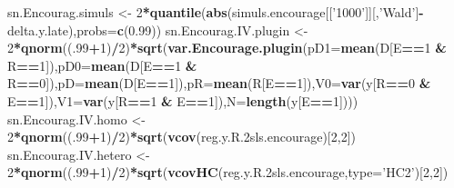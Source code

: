 \documentclass[]{book}
\newenvironment{Shaded}{\begin{snugshade}}{\end{snugshade}}
\newcommand{\DataTypeTok}[1]{\textcolor[rgb]{0.13,0.29,0.53}{#1}}
\newcommand{\DecValTok}[1]{\textcolor[rgb]{0.00,0.00,0.81}{#1}}
\newcommand{\FloatTok}[1]{\textcolor[rgb]{0.00,0.00,0.81}{#1}}
\newcommand{\KeywordTok}[1]{\textcolor[rgb]{0.13,0.29,0.53}{\textbf{#1}}}
\newcommand{\NormalTok}[1]{#1}
\newcommand{\OperatorTok}[1]{\textcolor[rgb]{0.81,0.36,0.00}{\textbf{#1}}}
\newcommand{\StringTok}[1]{\textcolor[rgb]{0.31,0.60,0.02}{#1}}
\theoremstyle{definition}
\theoremstyle{definition}
\theoremstyle{definition}
\theoremstyle{remark}
\begin{document}
\begin{Shaded}
\begin{Highlighting}[]
\NormalTok{sn.Encourag.simuls <-}\StringTok{ }\DecValTok{2}\OperatorTok{*}\KeywordTok{quantile}\NormalTok{(}\KeywordTok{abs}\NormalTok{(simuls.encourage[[}\StringTok{'1000'}\NormalTok{]][,}\StringTok{'Wald'}\NormalTok{]}\OperatorTok{-}\NormalTok{delta.y.late),}\DataTypeTok{probs=}\KeywordTok{c}\NormalTok{(}\FloatTok{0.99}\NormalTok{))}
\NormalTok{sn.Encourag.IV.plugin <-}\StringTok{ }\DecValTok{2}\OperatorTok{*}\KeywordTok{qnorm}\NormalTok{((.}\DecValTok{99}\OperatorTok{+}\DecValTok{1}\NormalTok{)}\OperatorTok{/}\DecValTok{2}\NormalTok{)}\OperatorTok{*}\KeywordTok{sqrt}\NormalTok{(}\KeywordTok{var.Encourage.plugin}\NormalTok{(}\DataTypeTok{pD1=}\KeywordTok{mean}\NormalTok{(D[E}\OperatorTok{==}\DecValTok{1} \OperatorTok{&}\StringTok{ }\NormalTok{R}\OperatorTok{==}\DecValTok{1}\NormalTok{]),}\DataTypeTok{pD0=}\KeywordTok{mean}\NormalTok{(D[E}\OperatorTok{==}\DecValTok{1} \OperatorTok{&}\StringTok{ }\NormalTok{R}\OperatorTok{==}\DecValTok{0}\NormalTok{]),}\DataTypeTok{pD=}\KeywordTok{mean}\NormalTok{(D[E}\OperatorTok{==}\DecValTok{1}\NormalTok{]),}\DataTypeTok{pR=}\KeywordTok{mean}\NormalTok{(R[E}\OperatorTok{==}\DecValTok{1}\NormalTok{]),}\DataTypeTok{V0=}\KeywordTok{var}\NormalTok{(y[R}\OperatorTok{==}\DecValTok{0} \OperatorTok{&}\StringTok{ }\NormalTok{E}\OperatorTok{==}\DecValTok{1}\NormalTok{]),}\DataTypeTok{V1=}\KeywordTok{var}\NormalTok{(y[R}\OperatorTok{==}\DecValTok{1} \OperatorTok{&}\StringTok{ }\NormalTok{E}\OperatorTok{==}\DecValTok{1}\NormalTok{]),}\DataTypeTok{N=}\KeywordTok{length}\NormalTok{(y[E}\OperatorTok{==}\DecValTok{1}\NormalTok{])))}
\NormalTok{sn.Encourag.IV.homo <-}\StringTok{ }\DecValTok{2}\OperatorTok{*}\KeywordTok{qnorm}\NormalTok{((.}\DecValTok{99}\OperatorTok{+}\DecValTok{1}\NormalTok{)}\OperatorTok{/}\DecValTok{2}\NormalTok{)}\OperatorTok{*}\KeywordTok{sqrt}\NormalTok{(}\KeywordTok{vcov}\NormalTok{(reg.y.R}\FloatTok{.2}\NormalTok{sls.encourage)[}\DecValTok{2}\NormalTok{,}\DecValTok{2}\NormalTok{])}
\NormalTok{sn.Encourag.IV.hetero <-}\StringTok{ }\DecValTok{2}\OperatorTok{*}\KeywordTok{qnorm}\NormalTok{((.}\DecValTok{99}\OperatorTok{+}\DecValTok{1}\NormalTok{)}\OperatorTok{/}\DecValTok{2}\NormalTok{)}\OperatorTok{*}\KeywordTok{sqrt}\NormalTok{(}\KeywordTok{vcovHC}\NormalTok{(reg.y.R}\FloatTok{.2}\NormalTok{sls.encourage,}\DataTypeTok{type=}\StringTok{'HC2'}\NormalTok{)[}\DecValTok{2}\NormalTok{,}\DecValTok{2}\NormalTok{])}
\end{Highlighting}
\end{Shaded}
\end{document}
